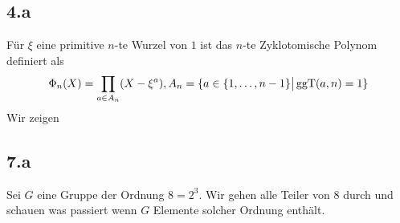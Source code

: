 \subsection*{4.a}
Für $\xi$ eine primitive $n$-te Wurzel von $1$ ist das $n$-te Zyklotomische Polynom definiert als
$$
\Phi_n(X) = \prod_{a \in A_n}(X - \xi^{a})
,
A_n = \{a \in \{1,\ldots,n-1\}\big\vert \operatorname{ggT}(a,n) = 1\}
$$
Wir zeigen 





\subsection*{7.a}
Sei $G$ eine Gruppe der Ordnung $8 = 2^{3}$.
Wir gehen alle Teiler von $8$ durch und schauen was passiert wenn $G$ Elemente solcher Ordnung enthält.

